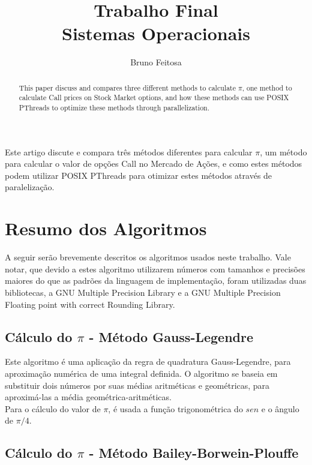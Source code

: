 \documentclass[12pt]{article}
\title{Trabalho Final \\ Sistemas Operacionais}
\author{Bruno Feitosa\inst{1}}
\begin{document}
 

\maketitle

\begin{abstract}
This paper discuss and compares three different methods to calculate $\pi$,
one method to calculate Call prices on Stock Market options,
and how these methods can use POSIX PThreads to optimize these methods through parallelization.
\end{abstract}
     
\begin{resumo} 
Este artigo discute e compara três métodos diferentes para calcular $\pi$,
um método para calcular o valor de opções Call no Mercado de Ações,
e como estes métodos podem utilizar POSIX PThreads para otimizar estes métodos
através de paralelização.
\end{resumo}


\section{Resumo dos Algoritmos}

A seguir serão brevemente descritos os algoritmos usados neste trabalho.
Vale notar, que devido a estes algoritmo utilizarem números com tamanhos e precisões maiores
do que as padrões da linguagem de implementação, foram utilizadas duas bibliotecas,
a GNU Multiple Precision Library\cite{GNU:MP} e a
GNU Multiple Precision Floating point with correct Rounding Library\cite{GNU:MPFR}.

\subsection{Cálculo do $\pi$ - Método Gauss-Legendre}

Este algoritmo é uma aplicação da regra de quadratura Gauss-Legendre,
para aproximação numérica de uma integral definida.
O algoritmo se baseia em substituir dois números por suas médias aritméticas e geométricas,
para aproximá-las a média geométrica-aritméticas.\\
Para o cálculo do valor de $\pi$, é usada a função trigonométrica do $sen$ e o ângulo de $\pi/4$.

\subsection{Cálculo do $\pi$ - Método Bailey-Borwein-Plouffe}
\end{document}
